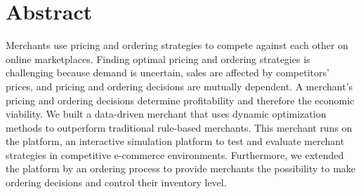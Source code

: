 \chapter*{Abstract}
Merchants use pricing and ordering strategies to compete against each other on online marketplaces.
Finding optimal pricing and ordering strategies is challenging because demand is uncertain, sales are affected by competitors' prices, and pricing and ordering decisions are mutually dependent.
A merchant's pricing and ordering decisions determine profitability and therefore the economic viability.
We built a data-driven merchant that uses dynamic optimization methods to outperform traditional rule-based merchants.
This merchant runs on the \pricewars platform, an interactive simulation platform to test and evaluate merchant strategies in competitive e-commerce environments.
Furthermore, we extended the platform by an ordering process to provide merchants the possibility to make ordering decisions and control their inventory level.
